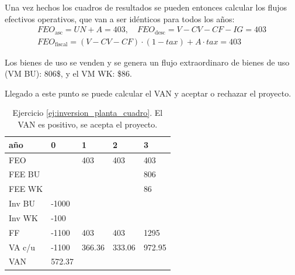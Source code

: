 \documentclass[twocolumn,10pt]{article}
\begin{document}
Una vez hechos los cuadros de resultados se pueden entonces calcular los flujos efectivos operativos, que van a ser idénticos para todos los años:
\begin{gather*}
	FEO_{\text{asc}} = UN+A = 403, \quad FEO_{\text{desc}} = V-CV-CF-IG = 403 \\
	FEO_{\text{fiscal}} = (V-CV-CF)\cdot(1-tax) + A\cdot tax = 403
\end{gather*}

Los bienes de uso se venden y se genera un flujo extraordinaro de bienes de uso (VM BU): 806\$, y el VM WK: \$86.

Llegado a este punto se puede calcular el VAN y aceptar o rechazar el proyecto.

\begin{table}[htb]
	\centering
	\caption{Ejercicio \ref{ej:inversion_planta_cuadro}. El VAN es positivo, se acepta el proyecto.}
	\begin{tabular}{l|llll}
	\textbf{año} & \textbf{0} & 1      & 2      & 3      \\ \hline
	FEO          &            & 403    & 403    & 403    \\
	FEE BU       &            &        &        & 806    \\ 
	FEE WK       &            &        &        & 86     \\
	Inv BU       & -1000      &        &        &        \\
	Inv WK       & -100       &        &        &        \\ \hline
	FF           & -1100      & 403    & 403    & 1295   \\
	VA c/u       & -1100      & 366.36 & 333.06 & 972.95 \\ \hline
	VAN          & 572.37     &        &        &       
	\end{tabular}
\end{table}
\end{document}
